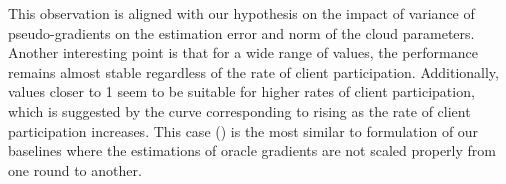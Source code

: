 \documentclass[runningheads]{llncs}
\begin{document}
This observation is aligned with our hypothesis on the impact of variance of pseudo-gradients on the estimation error and norm of the cloud parameters. Another interesting point is that for a wide range of  values, the performance remains almost stable regardless of the rate of client participation. Additionally,  values closer to 1 seem to be suitable for higher rates of client participation, which is suggested by the curve corresponding to  rising as the rate of client participation increases. This case () is the most similar to formulation of our baselines where the estimations of oracle gradients are not scaled properly from one round to another.
\begin{figure}[tb!]
  \centering
  \def\svgwidth{12.0cm}
  \begingroup \makeatletter \providecommand{}\providecommand{}\providecommand{}\newcommand*{}\newcommand*\lineheight[1]{\fontsize{\fsize}{#1\fsize}\selectfont}\ifx\svgwidth\undefined \setlength{\unitlength}{619.25939941bp}\ifx\svgscale\undefined \relax \else \setlength{\unitlength}{\unitlength * \real{\svgscale}}\fi \else \setlength{\unitlength}{\svgwidth}\fi \global\let\svgwidth\undefined \global\let\svgscale\undefined \makeatother 
\end{figure}
\end{document}
